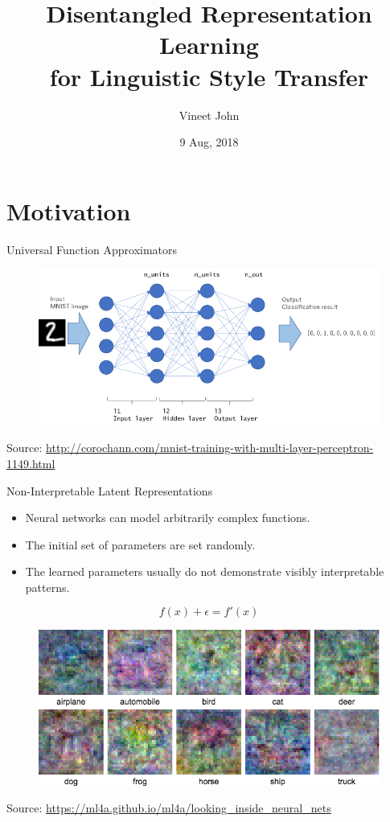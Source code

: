 \documentclass[aspectratio=169]{beamer}
\title{
	Disentangled Representation Learning\\
	for Linguistic Style Transfer}
\date{9 Aug, 2018}
\author{Vineet John}
\institute{University of Waterloo}
\newcommand{\imgsrc}[1]{\tiny{Source: #1}}
\begin{document}
\maketitle
\graphicspath{{images/}}

\section{Motivation}

\begin{frame}{Universal Function Approximators}
	\centering
	\begin{figure}[ht]
		\includegraphics[width=\linewidth]{mlp-network}
	\end{figure}
	\imgsrc{\url{http://corochann.com/mnist-training-with-multi-layer-perceptron-1149.html}}
\end{frame}

\begin{frame}{Non-Interpretable Latent Representations}
	\begin{itemize}
		\item Neural networks can model arbitrarily complex functions.
		\item The initial set of parameters are set randomly.
		\item The learned parameters usually do not demonstrate visibly interpretable patterns.
	\end{itemize}
	$$f(x) + \epsilon = f'(x)$$
	\centering
	\begin{figure}[ht]
		\includegraphics[width=0.5\linewidth]{uninterpretable-weights}
	\end{figure}
	\imgsrc{\url{https://ml4a.github.io/ml4a/looking_inside_neural_nets}}
\end{frame}
\end{document}

